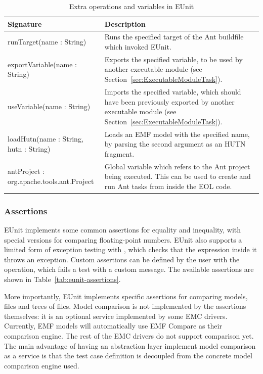 \begin{table}
  \begin{tabular}{|p{6cm}|p{6.5cm}|}
    \hline \textbf{Signature} & \textbf{Description}  \\\hline

    runTarget(name : String)      & Runs the specified target of the Ant buildfile which invoked EUnit. \\\hline

    exportVariable(name : String) & Exports the specified variable, to be used by another executable module (see Section~\ref{sec:ExecutableModuleTask}). \\\hline

    useVariable(name : String) & Imports the specified variable, which should have been previously exported by another executable module (see Section~\ref{sec:ExecutableModuleTask}). \\\hline

    loadHutn(name : String, hutn : String) & Loads an EMF model with the specified name, by parsing the second argument as an HUTN~\cite{HUTN} fragment. \\\hline

    antProject : org.apache.tools.ant.Project & Global variable which refers to the Ant project being executed. This can be used to create and run Ant tasks from inside the EOL code. \\\hline
  \end{tabular}
  \caption{Extra operations and variables in EUnit}
  \label{tab:eunit-operations}
\end{table}

\subsubsection{Assertions}

EUnit implements some common assertions for equality and inequality, with special versions for comparing floating-point numbers. EUnit also supports a limited form of exception testing with , which checks that the expression inside it throws an exception. Custom assertions can be defined by the user with the  operation, which fails a test with a custom message. The available assertions are shown in Table~\ref{tab:eunit-assertions}.

More importantly, EUnit implements specific assertions for comparing models, files and trees of files. Model comparison is not implemented by the assertions themselves: it is an optional service implemented by some EMC drivers. Currently, EMF models will automatically use EMF Compare as their comparison engine. The rest of the EMC drivers do not support comparison yet.  The main advantage of having an abstraction layer implement model comparison as a service is that the test case definition is decoupled from the concrete model comparison engine used.

